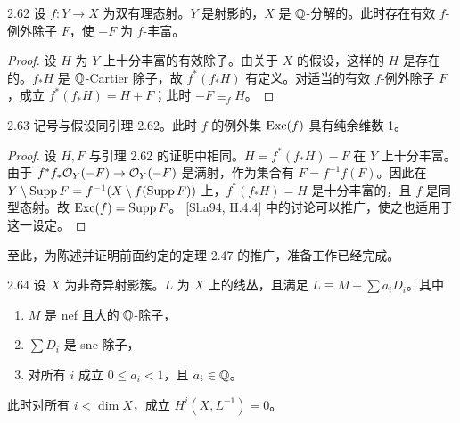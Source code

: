 \begin{lemmap}{2.62}
设 $f:Y\to X$ 为双有理态射。$Y$ 是射影的，$X$ 是 $\mathbb{Q}$-分解的。此时存在有效 $f$-例外除子 $F$，使 $-F$ 为 $f$-丰富。
\end{lemmap}

\begin{proof}
设 $H$ 为 $Y$ 上十分丰富的有效除子。由关于 $X$ 的假设，这样的 $H$ 是存在的。$f_*H$ 是 $\mathbb{Q}$-Cartier 除子，故 $f^*(f_*H)$ 有定义。对适当的有效 $f$-例外除子 $F$，成立 $f^*(f_*H)=H+F$；此时 $-F\equiv_f H$。
\end{proof}

\begin{corollaryp}{2.63}
记号与假设同引理 2.62。此时 $f$ 的例外集 $\operatorname{Exc}(f)$ 具有纯余维数 1。
\end{corollaryp}

\begin{proof}
设 $H,F$ 与引理 2.62 的证明中相同。$H=f^*(f_*H)-F$ 在 $Y$ 上十分丰富。由于 $f^*f_*\mathcal{O}_Y(-F)\to\mathcal{O}_Y(-F)$ 是满射，作为集合有 $F=f^{-1}f(F)$。因此在 $Y\setminus\operatorname{Supp} F=f^{-1}(X\setminus f(\operatorname{Supp} F))$ 上，$f^*(f_*H)=H$ 是十分丰富的，且 $f$ 是同型态射。故 $\operatorname{Exc}(f)=\operatorname{Supp} F$。
[Sha94, II.4.4] 中的讨论可以推广，使之也适用于这一设定。
\end{proof}

至此，为陈述并证明前面约定的定理 2.47 的推广，准备工作已经完成。

\begin{theoremp}{2.64}
设 $X$ 为非奇异射影簇。$L$ 为 $X$ 上的线丛，且满足 $L\equiv M+\sum a_iD_i$。其中
\begin{enumerate}[label=（\arabic*）,leftmargin=2.8em]
\item $M$ 是 nef 且大的 $\mathbb{Q}$-除子，
\item $\sum D_i$ 是 snc 除子，
\item 对所有 $i$ 成立 $0\le a_i<1$，且 $a_i\in\mathbb{Q}$。
\end{enumerate}
此时对所有 $i<\dim X$，成立 $H^i(X,L^{-1})=0$。
\end{theoremp}


